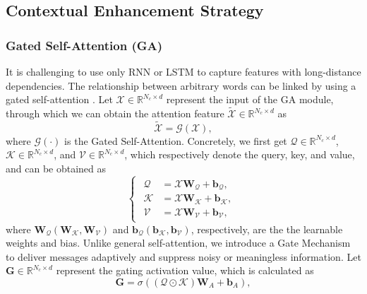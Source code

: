 \documentclass[journal]{IEEEtran}
\begin{document}
\subsection{Contextual Enhancement Strategy}\label{sectionDTGA}
\subsubsection{Gated Self-Attention (GA)}
It is challenging to use  only RNN \cite{jordan1997serial} or LSTM \cite{hochreiter1997long} to capture features with long-distance dependencies. The relationship between arbitrary words can be linked by using a gated self-attention \cite{zhao2018paragraph, qu2020context}. Let $\bm{\mathcal{X}} \in \mathbb{R}^{N_c \times d}$ represent the input of the GA module, through which we can obtain the attention feature $\tilde{\bm{\mathcal{X}}} \in \mathbb{R}^{N_c \times d}$ as
\begin{equation}\label{eqnGA}
\tilde{\bm{\mathcal{X}}} = \bm{\mathcal{G}}(\bm{\mathcal{X}}),
\end{equation}
where $\bm{\mathcal{G}}(\cdot)$ is the Gated Self-Attention. Concretely, we first get $\bm{\mathcal{Q}} \in \mathbb{R}^{N_c \times d}$, $\bm{\mathcal{K}} \in \mathbb{R}^{N_c \times d}$, and $\bm{\mathcal{V}} \in \mathbb{R}^{N_c \times d}$, which respectively denote the query, key, and value, and can be obtained as
\begin{equation}
\left\{\begin{array}{l}
\begin{aligned}
\bm{\mathcal{Q}} &= \bm{\mathcal{X}} \bm{W}_\mathcal{Q} + \bm{b}_\mathcal{Q}, \\
\bm{\mathcal{K}} &= \bm{\mathcal{X}} \bm{W}_\mathcal{K}+ \bm{b}_\mathcal{K}, \\
\bm{\mathcal{V}} &= \bm{\mathcal{X}} \bm{W}_\mathcal{V}+ \bm{b}_\mathcal{V},
\end{aligned}
\end{array}\right.
\end{equation}
where $\bm{W}_\mathcal{Q} (\bm{W}_\mathcal{K},\bm{W}_\mathcal{V})$ and $\bm{b}_\mathcal{Q} (\bm{b}_\mathcal{K},\bm{b}_\mathcal{V})$, respectively, are the the learnable weights and bias. Unlike general self-attention, we introduce a Gate Mechanism \cite{qu2020context} to deliver messages adaptively and suppress noisy or meaningless information. 
Let $\bm{G} \in \mathbb{R}^{N_c \times d}$ represent the gating activation value, which is calculated as
\begin{equation}
\bm{G}= \sigma\left( \left(\bm{\mathcal{Q}} \odot \bm{\mathcal{K}}\right) \bm{W}_A + \bm{b}_A \right),
\end{equation}
\end{document}
